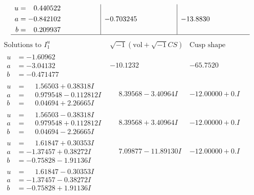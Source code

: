 \documentclass[1p]{elsarticle_modified}
\theoremstyle{definition}
\newcommand{\I}{\sqrt{-1}}
\begin{document}
$$\begin{array}{c|c|c}
\begin{aligned}
u &= \phantom{-}0.440522\phantom{ +0.000000I} \\
a &= -0.842102\phantom{ +0.000000I} \\
b &= \phantom{-}0.209937\phantom{ +0.000000I}\end{aligned}
 & -0.703245\phantom{ +0.000000I} & -13.8830\phantom{ +0.000000I}\\
 \hline 
 \end{array}$$\newpage$$\begin{array}{c|c|c}  
\text{Solutions to }I^u_{1}& \I (\text{vol} + \sqrt{-1}CS) & \text{Cusp shape}\\
 \hline 
\begin{aligned}
u &= -1.60962\phantom{ +0.000000I} \\
a &= -3.04132\phantom{ +0.000000I} \\
b &= -0.471477\phantom{ +0.000000I}\end{aligned}
 & -10.1232\phantom{ +0.000000I} & -65.7520\phantom{ +0.000000I} \\ \hline\begin{aligned}
u &= \phantom{-}1.56503 + 0.38318 I \\
a &= \phantom{-}0.979548 - 0.112812 I \\
b &= \phantom{-}0.04694 + 2.26665 I\end{aligned}
 & \phantom{-}8.39568 - 3.40964 I & -12.00000 + 0. I\phantom{ +0.000000I} \\ \hline\begin{aligned}
u &= \phantom{-}1.56503 - 0.38318 I \\
a &= \phantom{-}0.979548 + 0.112812 I \\
b &= \phantom{-}0.04694 - 2.26665 I\end{aligned}
 & \phantom{-}8.39568 + 3.40964 I & -12.00000 + 0. I\phantom{ +0.000000I} \\ \hline\begin{aligned}
u &= \phantom{-}1.61847 + 0.30353 I \\
a &= -1.37457 + 0.38272 I \\
b &= -0.75828 - 1.91136 I\end{aligned}
 & \phantom{-}7.09877 - 11.89130 I & -12.00000 + 0. I\phantom{ +0.000000I} \\ \hline\begin{aligned}
u &= \phantom{-}1.61847 - 0.30353 I \\
a &= -1.37457 - 0.38272 I \\
b &= -0.75828 + 1.91136 I\end{aligned}

\end{array}$$
\end{document}
